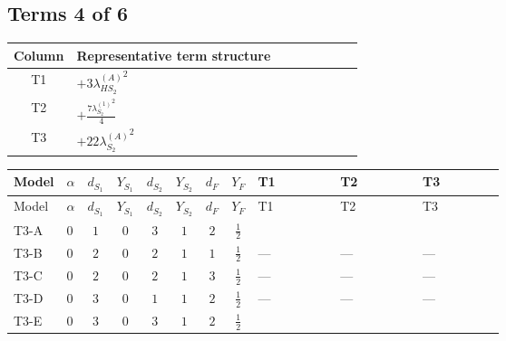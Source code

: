 \documentclass[8pt]{article}
\begin{document}
\begin{landscape}
\subsection*{Terms 4 of 6}
\begin{center}
\begin{tabular}{@{}c >{\raggedright\arraybackslash}p{0.82\linewidth}@{}}
\toprule
Column & Representative term structure \\
\midrule
T1 & \(\displaystyle +3 {\lambda_{HS_2}^{(A)}}^2\) \\
\midrule
T2 & \(\displaystyle +\frac{7 {\lambda_{S_2}^{(1)}}^2}{4}\) \\
\midrule
T3 & \(\displaystyle +22 {\lambda_{S_2}^{(A)}}^2\) \\
\midrule
\bottomrule
\end{tabular}
\end{center}
\smallskip
\tiny
\begin{longtable}{@{}llcccccc >{\raggedright\arraybackslash}p{0.21\linewidth} >{\raggedright\arraybackslash}p{0.21\linewidth} >{\raggedright\arraybackslash}p{0.21\linewidth}@{}}
\toprule
Model & $\alpha$ & $d_{S_1}$ & $Y_{S_1}$ & $d_{S_2}$ & $Y_{S_2}$ & $d_F$ & $Y_F$ & T1 & T2 & T3 \\
\midrule
\endfirsthead
\toprule
Model & $\alpha$ & $d_{S_1}$ & $Y_{S_1}$ & $d_{S_2}$ & $Y_{S_2}$ & $d_F$ & $Y_F$ & T1 & T2 & T3 \\
\midrule
\endhead
T3-A & $0$ & $1$ & $0$ & $3$ & $1$ & $2$ & $\frac{1}{2}$ & \scriptsize\adjustbox{max width=\linewidth}{$\begin{gathered} +3 {\lambda_{HS_2}^{(A)}}^2\end{gathered}$} & \scriptsize\adjustbox{max width=\linewidth}{$\begin{gathered} +\frac{7 {\lambda_{S_2}^{(1)}}^2}{4}\end{gathered}$} & \scriptsize\adjustbox{max width=\linewidth}{$\begin{gathered} +22 {\lambda_{S_2}^{(A)}}^2\end{gathered}$} \\
\midrule
T3-B & $0$ & $2$ & $0$ & $2$ & $1$ & $1$ & $\frac{1}{2}$ & --- & --- & --- \\
\midrule
T3-C & $0$ & $2$ & $0$ & $2$ & $1$ & $3$ & $\frac{1}{2}$ & --- & --- & --- \\
\midrule
T3-D & $0$ & $3$ & $0$ & $1$ & $1$ & $2$ & $\frac{1}{2}$ & --- & --- & --- \\
\midrule
T3-E & $0$ & $3$ & $0$ & $3$ & $1$ & $2$ & $\frac{1}{2}$ & \scriptsize\adjustbox{max width=\linewidth}{$\begin{gathered} +3 {\lambda_{HS_2}^{(A)}}^2\end{gathered}$} & \scriptsize\adjustbox{max width=\linewidth}{$\begin{gathered} +\frac{7 {\lambda_{S_2}^{(1)}}^2}{4}\end{gathered}$} & \scriptsize\adjustbox{max width=\linewidth}{$\begin{gathered} +22 {\lambda_{S_2}^{(A)}}^2\end{gathered}$} \\

\end{longtable}
\end{landscape}
\end{document}
